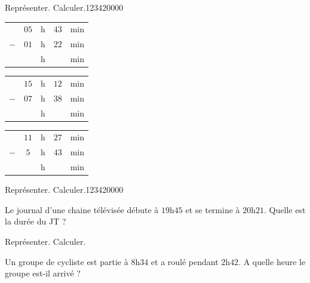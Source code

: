 \begin{pageAD}
\begin{ExoCad}{Représenter. Calculer.}{1234}{2}{0}{0}{0}{0}
 
 \begin{minipage}{0.30\linewidth}
\begin{tabular}{ccccc} 
& $05$ & h &  $43$ & min \\ 
$-$   & $01$ & h & $22$ & min\\ 
\hline 
   &  & h & & min\\
\end{tabular} 
\end{minipage}
\hfill 
\begin{minipage}{0.30\linewidth}
 \begin{tabular}{ccccc} 
& $15$ & h &  $12$ & min \\ 
$-$   & $07$ & h &  $38$ & min\\ 
\hline 
   &  & h & & min\\
\end{tabular} 
\end{minipage}
\hfill 
\begin{minipage}{0.30\linewidth}
 \begin{tabular}{ccccc} 
& $11$ & h & $27$  & min \\ 
$-$   & $5$ & h & $43$ & min\\ 
\hline 
   &  & h & & min\\
\end{tabular} 
\end{minipage}
 
\end{ExoCad}



\begin{minipage}{0.49\linewidth}

\begin{ExoCad}{Représenter. Calculer.}{1234}{2}{0}{0}{0}{0}

Le journal d'une chaine télévisée débute à $19$h$45$ et se termine à $20$h$21$. Quelle est la durée du JT ?
 \end{ExoCad}
\end{minipage}
\hfill 
 \begin{minipage}{0.49\linewidth}
\begin{ExoCad}{Représenter. Calculer.}

Un groupe de cycliste est partie à $8$h$34$ et a roulé pendant $2$h$42$. A quelle heure le groupe est-il arrivé  ?
\end{ExoCad}
\end{minipage}

 



\end{pageAD}
